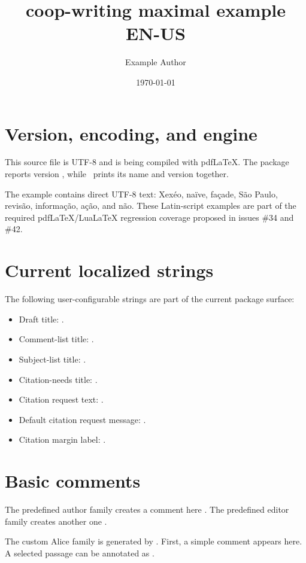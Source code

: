 \documentclass[11pt]{article}
\title{coop-writing maximal example\\EN-US}
\author{Example Author}
\date{\today}
\newcommand{\CWEngine}{pdfLaTeX}
\newcommand{\CWEngine}{LuaLaTeX}
\newcommand{\CWEngine}{another TeX engine}
\begin{document}
\maketitle

\section{Version, encoding, and engine}

This source file is UTF-8 and is being compiled with \CWEngine.
The package reports version \coopwritingversion, while
\printcoopwritingversion\ prints its name and version together.

The example contains direct UTF-8 text: Xexéo, naïve, façade, São Paulo,
revisão, informação, ação, and não. These Latin-script examples are part of
the required pdfLaTeX/LuaLaTeX regression coverage proposed in issues \#34
and \#42.

\section{Current localized strings}

The following user-configurable strings are part of the current package surface:

\begin{itemize}
  \item Draft title: \cwdrafttitle.
  \item Comment-list title: \cwcommentstitle.
  \item Subject-list title: \cwsubjtitle.
  \item Citation-needs title: \cwcitationstitle.
  \item Citation request text: \cwpleasecitetext.
  \item Default citation request message: \cwpleasecitemessage.
  \item Citation margin label: \cwpleasecitemarginnote.
\end{itemize}

\section{Basic comments}

The predefined author family creates a comment here
.
The predefined editor family creates another one
.

The custom Alice family is generated by \texttt{\string\cwnamedef}. First,
a simple comment appears here. A selected
passage can be annotated as
.
\end{document}

